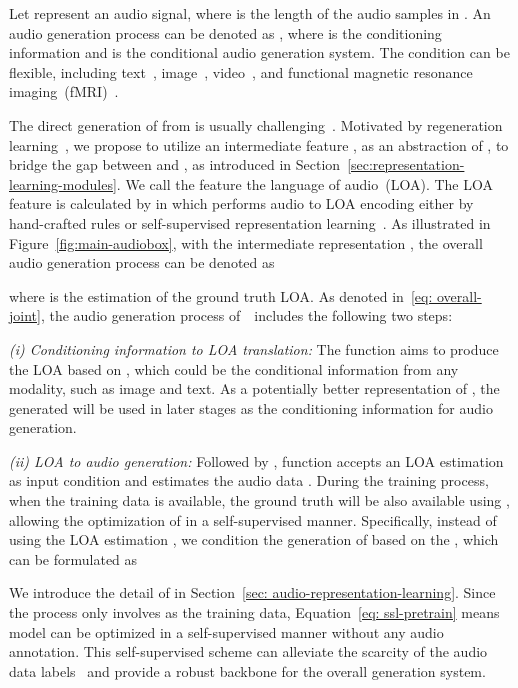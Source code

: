 \documentclass[lettersize,journal]{IEEEtran}
\begin{document}
\noindent
Let  represent an audio signal, where  is the length of the audio samples in . An audio generation process can be denoted as , where  is the conditioning information and  is the conditional audio generation system. The condition  can be flexible, including text~\cite{liu2023audioldm}, image~\cite{sheffer2023hear-image-to-audio}, video~\cite{iashin2021taming-specvqgan}, and functional magnetic resonance imaging~(fMRI)~\cite{denk2023brain2music}. 



The direct generation of  from  is usually challenging~\cite{oord2016wavenet}. Motivated by regeneration learning~\cite{tan2023regeneration}, we propose to utilize an intermediate feature , as an abstraction of , to bridge the gap between  and , as introduced in Section~\ref{sec:representation-learning-modules}. We call the feature  the language of audio~(LOA). The LOA feature is calculated by  
in which  performs audio to LOA encoding either by hand-crafted rules or self-supervised representation learning~\cite{tan2023regeneration}. 
As illustrated in Figure~\ref{fig:main-audiobox}, with the intermediate representation , the overall audio generation process can be denoted as 


where  is the estimation of the ground truth LOA.
As denoted in~\eqref{eq: overall-joint}, the audio generation process of~\vModelName~includes the following two steps: 

\textit{(i) Conditioning information to LOA translation:}
The function  aims to produce the LOA  based on , which could be the conditional information from any modality, such as image and text. As a potentially better representation of , the generated  will be used in later stages as the conditioning information for audio generation. 


\textit{(ii) LOA to audio generation:}
Followed by , function  accepts an LOA estimation  as input condition and estimates the audio data . 
During the training process, when the training data  is available, the ground truth  will be also available using , allowing the optimization of  in a self-supervised manner. Specifically, instead of using the LOA estimation , we condition the generation of  based on the , which can be formulated as


\noindent
We introduce the detail of  in Section~\ref{sec: audio-representation-learning}. Since the process  only involves  as the training data, Equation~\eqref{eq: ssl-pretrain} means model  can be optimized in a self-supervised manner without any audio annotation. This self-supervised scheme can alleviate the scarcity of the audio data labels~\cite{liu2023audioldm} and provide a robust backbone for the overall generation system.
\end{document}
